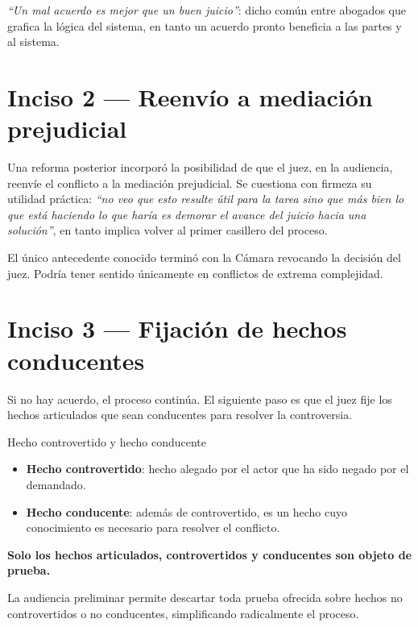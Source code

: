 \documentclass[12pt,oneside]{book}
\begin{document}
\begin{note}
\textit{“Un mal acuerdo es mejor que un buen juicio”}: dicho común entre abogados que grafica la lógica del sistema, en tanto un acuerdo pronto beneficia a las partes y al sistema.
\end{note}

\section{Inciso 2 --- Reenvío a mediación prejudicial}

Una reforma posterior incorporó la posibilidad de que el juez, en la audiencia, reenvíe el conflicto a la mediación prejudicial. Se cuestiona con firmeza su utilidad práctica: \textit{“no veo que esto resulte útil para la tarea sino que más bien lo que está haciendo lo que haría es demorar el avance del juicio hacia una solución”}, en tanto implica volver al primer casillero del proceso.

\begin{note}
El único antecedente conocido terminó con la Cámara revocando la decisión del juez. Podría tener sentido únicamente en conflictos de extrema complejidad.
\end{note}

\section{Inciso 3 --- Fijación de hechos conducentes}

Si no hay acuerdo, el proceso continúa. El siguiente paso es que el juez fije los hechos articulados que sean conducentes para resolver la controversia.

\begin{definition}{Hecho controvertido y hecho conducente}
\begin{itemize}
    \item \textbf{Hecho controvertido}: hecho alegado por el actor que ha sido negado por el demandado.
    \item \textbf{Hecho conducente}: además de controvertido, es un hecho cuyo conocimiento es necesario para resolver el conflicto.
\end{itemize}
\textbf{Solo los hechos articulados, controvertidos y conducentes son objeto de prueba.}
\end{definition}

La audiencia preliminar permite descartar toda prueba ofrecida sobre hechos no controvertidos o no conducentes, simplificando radicalmente el proceso.
\end{document}
